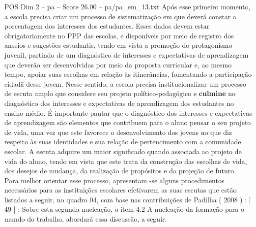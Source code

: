 \begin{textsample}{POS Dim 2 – pa – Score 26.00 – pa/pa\_em\_13.txt}
Após esse primeiro momento, a escola precisa criar um processo de sistematização em que deverá constar a porcentagem dos interesses dos estudantes.
Esses dados devem estar obrigatoriamente no PPP das escolas, e disponíveis por meio de registro dos anseios e sugestões estudantis, tendo em vista a promoção do protagonismo juvenil, partindo de um diagnóstico de interesses e expectativas de aprendizagem que deverão ser desenvolvidas por meio da proposta curricular e, ao mesmo tempo, apoiar suas escolhas em relação às itinerâncias, fomentando a participação cidadã desse jovem.
Nesse sentido, a escola precisa institucionalizar um processo de escuta amplo que considere seu projeto político-pedagógico e \textbf{culmine} no diagnóstico dos interesses e expectativas de aprendizagem dos estudantes no ensino médio.
É importante pautar que o diagnóstico dos interesses e expectativas de aprendizagem são elementos que contribuem para o aluno pensar o seu projeto de vida, uma vez que este favorece o desenvolvimento dos jovens no que diz respeito às suas identidades e sua relação de pertencimento com a comunidade escolar.
A escuta adquire um maior significado quando associada ao projeto de vida do aluno, tendo em vista que este trata da construção das escolhas de vida, dos desejos de mudança, da realização de propósitos e da projeção de futuro.
Para melhor orientar esse processo, apresentam -se alguns procedimentos necessários para as instituições escolares efetivarem as suas escutas que estão listados a seguir, no quadro 04, com base nas contribuições de Padilha ( 2008 ) : [ 49 ] : Sobre esta segunda nucleação, o item 4.2 A nucleação da formação para o mundo do trabalho, abordará essa discussão, a seguir.

\end{textsample}
